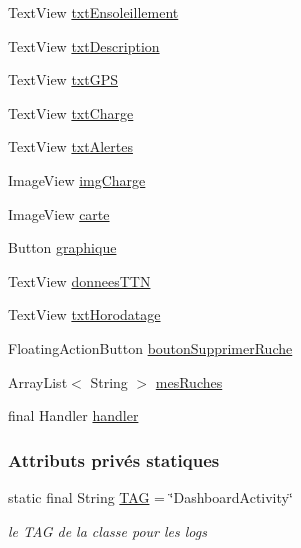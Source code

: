 \begin{DoxyCompactItemize}
\item 
Text\+View \hyperlink{classfr_1_1campus_1_1laurainc_1_1honeybee_1_1_dashboard_activity_aab4b50b607051748d695f8062e21e56e}{txt\+Ensoleillement}
\item 
Text\+View \hyperlink{classfr_1_1campus_1_1laurainc_1_1honeybee_1_1_dashboard_activity_a25b7b3ebb01b0a78ed4935f7881c89ab}{txt\+Description}
\item 
Text\+View \hyperlink{classfr_1_1campus_1_1laurainc_1_1honeybee_1_1_dashboard_activity_a0742bf6c7661b82f22ed90db43203029}{txt\+G\+PS}
\item 
Text\+View \hyperlink{classfr_1_1campus_1_1laurainc_1_1honeybee_1_1_dashboard_activity_a00185be7c66330a5a55881125fe5e400}{txt\+Charge}
\item 
Text\+View \hyperlink{classfr_1_1campus_1_1laurainc_1_1honeybee_1_1_dashboard_activity_abd1bc0732518150012172aaeee6e059b}{txt\+Alertes}
\item 
Image\+View \hyperlink{classfr_1_1campus_1_1laurainc_1_1honeybee_1_1_dashboard_activity_a2f9d67ea169a7cd9969d0fbe30e77fbc}{img\+Charge}
\item 
Image\+View \hyperlink{classfr_1_1campus_1_1laurainc_1_1honeybee_1_1_dashboard_activity_a99952672b3fddf694d15b817a1f933ab}{carte}
\item 
Button \hyperlink{classfr_1_1campus_1_1laurainc_1_1honeybee_1_1_dashboard_activity_a4170811fcbd865749a176f2c5c6ba617}{graphique}
\item 
Text\+View \hyperlink{classfr_1_1campus_1_1laurainc_1_1honeybee_1_1_dashboard_activity_a13c39ae74cce0c7f40b1d67e71d145cb}{donnees\+T\+TN}
\item 
Text\+View \hyperlink{classfr_1_1campus_1_1laurainc_1_1honeybee_1_1_dashboard_activity_a441403e9cd9a95a230d48b86090c4903}{txt\+Horodatage}
\item 
Floating\+Action\+Button \hyperlink{classfr_1_1campus_1_1laurainc_1_1honeybee_1_1_dashboard_activity_adeac9187a698545c246d039630bacd13}{bouton\+Supprimer\+Ruche}
\item 
Array\+List$<$ String $>$ \hyperlink{classfr_1_1campus_1_1laurainc_1_1honeybee_1_1_dashboard_activity_a85c92d113540b2ae3c20077050f1a90b}{mes\+Ruches}
\item 
final Handler \hyperlink{classfr_1_1campus_1_1laurainc_1_1honeybee_1_1_dashboard_activity_a7dd06030cd3afe35ace9a5e2f9e789dd}{handler}
\end{DoxyCompactItemize}
\subsubsection*{Attributs privés statiques}
\begin{DoxyCompactItemize}
\item 
static final String \hyperlink{classfr_1_1campus_1_1laurainc_1_1honeybee_1_1_dashboard_activity_a716b8b0ff7279634ec5d3079ddf5d840}{T\+AG} = \char`\"{}Dashboard\+Activity\char`\"{}
\begin{DoxyCompactList}\small\item\em le T\+AG de la classe pour les logs \end{DoxyCompactList}\end{DoxyCompactItemize}


